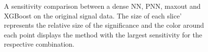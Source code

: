 \begin{figure}
    \caption[A sensitivity comparison between a dense \acs{NN}, \acs{PNN}, maxout and XGBoost on the original 
    signal data.]{A sensitivity comparison between a dense \ac{NN}, \ac{PNN}, maxout and XGBoost on the original 
    signal data. The size of each slice' represents the relative size of the significance and the color around each 
    point displays the method with the largest sensitivity for the respective combination.}
    \label{fig:GenPlussXGB}
\end{figure}
